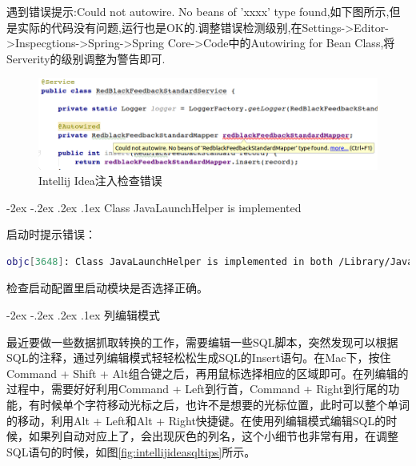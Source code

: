 \documentclass[12pt]{book}
\makeatletter
\numberwithin{dummy}{section}
\theoremstyle{ocrenumbox}
\theoremstyle{blacknumex}
\theoremstyle{blacknumbox}
\theoremstyle{ocrenum}
\renewcommand\paragraph{\@startsection{paragraph}{4}{\z@}
	{-2ex \@plus-.2ex \@minus .2ex}
	{.1ex}
	{\normalfont\small\sffamily\bfseries}}
\makeatother
\begin{document}
遇到错误提示:Could not autowire. No beans of 'xxxx' type found,如下图所示,但是实际的代码没有问题,运行也是OK的.调整错误检测级别,在Settings->Editor->Inspecgtions->Spring->Spring Core->Code中的Autowiring for Bean Class,将Serverity的级别调整为警告即可.

\begin{figure}[htbp]
	\centering
	\includegraphics[scale=0.45]{autowiredcheckerror.png}
	\caption{Intellij Idea注入检查错误}
	\label{fig:autowiredcheckerror}
\end{figure}


\paragraph{Class JavaLaunchHelper is implemented}


启动时提示错误：

\begin{lstlisting}[language=Bash]
objc[3648]: Class JavaLaunchHelper is implemented in both /Library/Java/JavaVirtualMachines/jdk1.8.0_121.jdk/Contents/Home/bin/java (0x10d19c4c0) and /Library/Java/JavaVirtualMachines/jdk1.8.0_121.jdk/Contents/Home/jre/lib/libinstrument.dylib (0x10ea194e0). One of the two will be used. Which one is undefined.
\end{lstlisting}


检查启动配置里启动模块是否选择正确。

\paragraph{列编辑模式}

最近要做一些数据抓取转换的工作，需要编辑一些SQL脚本，突然发现可以根据SQL的注释，通过列编辑模式轻轻松松生成SQL的Insert语句。在Mac下，按住Command + Shift + Alt组合键之后，再用鼠标选择相应的区域即可。在列编辑的过程中，需要好好利用Command + Left到行首，Command + Right到行尾的功能，有时候单个字符移动光标之后，也许不是想要的光标位置，此时可以整个单词的移动，利用Alt + Left和Alt + Right快捷键。在使用列编辑模式编辑SQL的时候，如果列自动对应上了，会出现灰色的列名，这个小细节也非常有用，在调整SQL语句的时候，如图\ref{fig:intellijideasqltips}所示。
\end{document}
